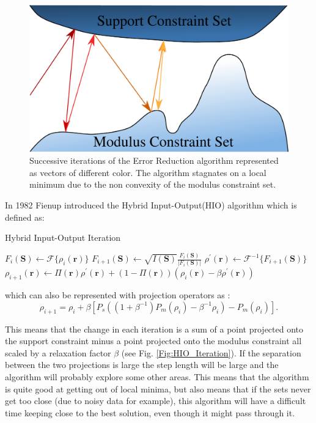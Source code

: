 \begin{figure}[h]
\centering
  \includegraphics[width=0.8 \columnwidth]{Image_Reconstruction/Stagnation.pdf}
  \caption{Successive iterations of the Error Reduction algorithm represented as
    vectors of different color. The algorithm stagnates on a local minimum due
    to the non convexity of the modulus constraint set.}
  \label{Fig:Stagnation}
\end{figure}

In 1982 Fienup introduced the Hybrid Input-Output(HIO) algorithm \cite{Fienup82}
which is defined as:
\begin{algorithm}
\caption{Hybrid Input-Output Iteration}
\begin{algorithmic}
  \STATE $F_{i}(\mathbf S) \gets \mathscr{F}\{\rho_i(\mathbf r)\}$
  \STATE $F_{i+1}(\mathbf S) \gets \sqrt{I(\mathbf S)} \frac{F_i(\mathbf
    S)}{|F_i(\mathbf S)|}$
  \STATE $\rho^{\prime}(\mathbf r) \gets \mathscr{F}^{-1}\{F_{i+1}(\mathbf S)\}$
  \STATE $\rho_{i+1}(\mathbf r) \gets \Pi(\mathbf r) \rho^{\prime}(\mathbf r) +
  (1-\Pi(\mathbf r)) (\rho_i(\mathbf r)-\beta \rho^{\prime}(\mathbf r))$
\end{algorithmic}
\end{algorithm}

which can also be represented with projection operators as \cite{Thiebault_Thesis}:
\begin{equation}
  \rho_{i+1} = \rho_{i} + \beta\left[P_s((1+\beta^{-1})P_m(\rho_i)-\beta^{-1}
    \rho_{i}) -P_m(\rho_i)\right] .
\end{equation}

This means that the change in each iteration is a sum of a point projected onto the
support constraint minus a point projected onto the modulus constraint all
scaled by a relaxation factor $\beta$ (see Fig. \ref{Fig:HIO_Iteration}). If the
separation between the two 
projections is large the step length will be large and the algorithm will
probably explore some other areas. This means that the algorithm is quite good
at getting out of local minima, but also means that if the sets never get too
close (due to noisy data for example), this algorithm will have a difficult time
keeping close to the best solution, even though it might pass through it.

